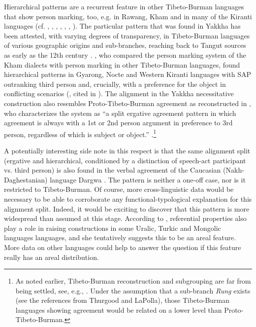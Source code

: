 Hierarchical patterns are a recurrent feature  in other Tibeto-Burman languages that show person marking, too, e.g. in Rawang, Kham and in many of the Kiranti languages (cf. \citealt[317]{DeLancey1989Verb}, \citealt[311]{LaPolla1992Dating}, \citealt[30]{LaPolla2003_Overview}, \citealt{LaPolla2007Hierarchical}, \citealt[473]{Ebert1987Grammatical}, \citealt[1]{DeLancey2011_Notes}, \citealt[398]{Watters2002A-grammar}). The particular pattern that was found in Yakkha has been attested, with varying degrees of transparency, in Tibeto-Burman languages of various geographic origins and sub-branches, reaching back to Tangut sources as early as the 12th century \citep{Kepping1975_Subject, Kepping1994The-conjugation}. \citet{Watters2002A-grammar}, who compared the person marking system of the Kham dialects with person marking in other Tibeto-Burman languages, found hierarchical patterns in Gyarong, Nocte and Western Kiranti languages with SAP outranking third person and, crucially, with a preference for the object in conflicting scenarios (\citet{Nagano1984A-historical}, cited in \citet[388]{Watters2002A-grammar}). The alignment in the Yakkha necessitative construction also resembles Proto-Tibeto-Burman agreement as reconstructed in \citet{DeLancey1989Verb}, who characterizes the system as  “a split ergative agreement pattern in which agreement is always with a 1st or 2nd person argument in preference to 3rd person, regardless of which is subject or object.” \citep[317]{DeLancey1989Verb}.\footnote{As noted earlier, Tibeto-Burman reconstruction and subgrouping are far from being settled, see, e.g., \citet{Thurgood1984The-Rung, DeLancey1989Verb, DeLancey2010_Towards, DeLancey2011_Notes, LaPolla1992Dating, LaPolla2012_Comments, Jacques2012_Agreement}. Under the assumption that  a sub-branch \emph{Rung} exists (see the references from Thurgood and LaPolla), those Tibeto-Burman languages showing agreement would be related on a lower level than Proto-Tibeto-Burman.}


A potentially interesting side note in this respect is that the same alignment split (ergative and hierarchical, conditioned by a distinction of speech-act participant vs. third person) is also found in the verbal agreement of the Caucasian (Nakh-Daghestanian) language Dargwa \citep[208]{Zuniga2007_From}. The pattern is neither a one-off case, nor is it restricted to Tibeto-Burman. Of course, more cross-linguistic data would be necessary to be able to corroborate any functional-typological explanation for this alignment split. Indeed, it would be exciting to discover that this pattern is more widespread than  assumed at this stage. According to \citet{Serdobolskaya2009_Raising}, referential properties also play a role  in raising constructions in some Uralic, Turkic and Mongolic languages languages, and she tentatively suggests this to be an areal feature. More data on other languages could help to answer the question if this feature really has an areal distribution.  


